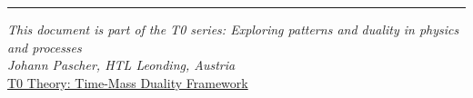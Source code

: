 \documentclass[12pt,a4paper]{article}
\begin{document}
	\begin{center}
		\hrule
		\vspace{0.5cm}
		\textit{This document is part of the T0 series: Exploring patterns and duality in physics and processes}\\
		\textit{Johann Pascher, HTL Leonding, Austria}\\
		\vspace{0.3cm}
		\href{https://github.com/jpascher/T0-Time-Mass-Duality}{T0 Theory: Time-Mass Duality Framework}
		\vspace{0.3cm}
	\end{center}
	
\end{document}
